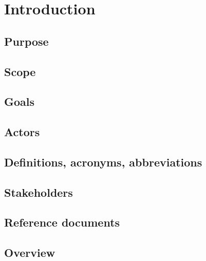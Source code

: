 \documentclass[12pt, a4paper]{article}
\title{
	\Huge{\textbf{\centerline{myTaxiService}}}
	\newline
	\huge{\textbf{R}equirement \textbf{A}nalysis and \textbf{S}pecification \textbf{D}ocument}
}
\author{
	Monica Magoni 854091
	\\
	Alberto Cibari 852689
}
\date{\today}
\begin{document}
	\maketitle
	\newpage
	\renewcommand*\contentsname{\Huge{Contents}}
	\tableofcontents
	
	\newpage
	
\section{Introduction}
	
	\subsection{Purpose}
	
	
	\subsection{Scope}
	
	
	\subsection{Goals}
	
	
	\subsection{Actors}
	
	
	\subsection{Definitions, acronyms, abbreviations}
	
	
	\subsection{Stakeholders}
	
	
	\subsection{Reference documents}
	

	\subsection{Overview}
	
	
\end{document}

